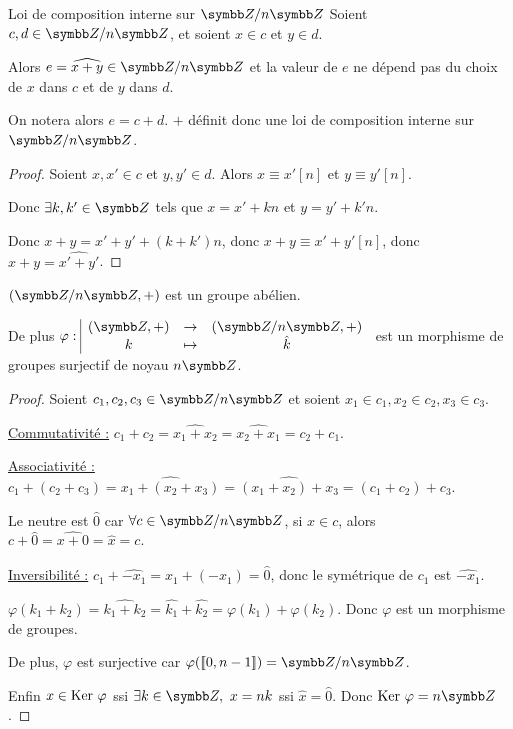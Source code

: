 \begin{proposition}{Loi de composition interne sur $\Z/n\Z$}{}
    Soient $c, d \in \Z/n\Z$, et soient $x \in c$ et $y \in d$. 

    Alors $e = \widehat{x + y} \in \Z/n \Z$ et la valeur de $e$ ne dépend pas du choix de $x$
    dans $c$ et de $y$ dans $d$.

    On notera alors $e = c + d$.
    $+$ définit donc une loi de composition interne sur $\Z/n\Z$.
\end{proposition}


\begin{proof}
    Soient $x, x' \in c$ et $y, y' \in d$.
    Alors $x \equiv x' [n]$ et $y \equiv y' [n]$.

    Donc $\exists k, k' \in \Z$ tels que $x = x' + kn$ et $y = y' + k'n$.

    Donc $x + y = x' + y' + (k + k')n$, donc $x + y \equiv x' + y' [n]$,
    donc $\widehat{x + y} = \widehat{x' + y'}$.
\end{proof}

\begin{theoreme}{}{}
    $(\Z/n\Z, +)$ est un groupe abélien.

    De plus $\fonction{\varphi}{(\Z, +)}{(\Z/n\Z, +)}{k}{\hat k}$ est un morphisme de groupes surjectif de noyau $n\Z$.
\end{theoreme}


\begin{proof}
    Soient $c_1, c_2, c_3 \in \Z/n\Z$ et soient $x_1 \in c_1, x_2 \in c_2, x_3 \in c_3$.

    \uline{Commutativité :} $c_1 + c_2 = \widehat{x_1 + x_2} = \widehat{x_2 + x_1} = c_2 + c_1$.

    \uline{Associativité :} $c_1 + (c_2 + c_3) = \widehat{x_1 + (x_2 + x_3)} = \widehat{(x_1 + x_2) + x_3} = (c_1 + c_2) + c_3$.

    \avspace Le neutre est $\hat 0$ car $\forall c \in \Z/n\Z$, si $x \in c$, alors
    $c + \hat 0 = \widehat{x + 0} = \hat x = c$.

    \avspace \uline{Inversibilité :} $c_1 + \hat{-x_1} = \widehat{x_1 + (-x_1)} = \hat 0$, donc le symétrique de $c_1$ est $\hat{-x_1}$.

    \avspace $\varphi(k_1 + k_2) = \widehat{k_1 + k_2} = \hat{k_1} + \hat{k_2} = \varphi(k_1) + \varphi(k_2)$.
    Donc $\varphi$ est un morphisme de groupes.

    De plus, $\varphi$ est surjective car $\varphi(\ninter 0 {n-1}) = \Z/n\Z$.

    Enfin $x \in \operatorname{Ker} \, \varphi$ ssi $\exists k \in \Z,~x = nk$ ssi $\hat x = \hat 0$.
    Donc $\Ker \varphi = n\Z$.
\end{proof}

